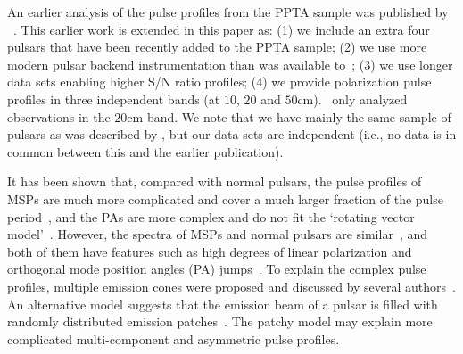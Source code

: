 \documentclass[useAMS,usenatbib]{mn2e}
\begin{document}
An earlier analysis of the pulse profiles from the PPTA sample was published by
~\citet{Yan11}. This earlier work is extended in this paper as:
%
(1) we include an extra four pulsars that have been recently added to the PPTA sample;
(2) we use more modern pulsar backend instrumentation than was available to~\citet{Yan11};
(3) we use longer data sets enabling higher S/N ratio profiles;
(4) we provide polarization pulse profiles in three independent bands 
(at $10$, $20$ and $50$cm).~\citet{Yan11} only analyzed observations in the $20$cm band.
%
We note that we have mainly the same sample of pulsars as was described by \citet{Yan11}, 
but our data sets are independent (i.e., no data is in common between this and the earlier 
publication).

It has been shown that, compared with normal pulsars, the pulse profiles of MSPs are 
much more complicated and cover a much larger fraction of the pulse period~\citep{Yan11}, 
and the PAs are more complex and do not fit the `rotating vector model'~\citep[RVM,][]{Radhakrishnan69}.
%
However, the spectra of MSPs and normal pulsars are similar~\citep{Toscano98,Kramer98,Kramer99}, 
and both of them have features such as high degrees of linear polarization and orthogonal 
mode position angles (PA) jumps~\citep[see e.g.,][]{Thorsett90,Navarro97,Stairs99,Manchester04,Ord04}.
%
To explain the complex pulse profiles, multiple emission cones were proposed 
and discussed by several authors~\citep{Rankin93,Kramer94,Gupta03}. An alternative 
model suggests that the emission beam of a pulsar is filled with randomly 
distributed emission patches~\citep{Lyne88,Manchester95_2,Han01}. The patchy 
model may explain more complicated multi-component and asymmetric pulse profiles.
%
\end{document}

